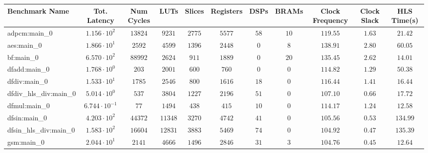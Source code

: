 \begin{tabular}{|l|c|c|c|c|c|c|c|c|c|c|}
\hline
Benchmark Name          & Tot. Latency            & Num Cycles & LUTs      & Slices    & Registers & DSPs    & BRAMs   & Clock Frequency & Clock Slack & HLS Time(s) \\
\hline
adpcm:main\_0           & $ 1.156 \cdot 10^{2}  $ & $ 13824  $ & $ 9231  $ & $ 2775  $ & $ 5577  $ & $ 58  $ & $ 10  $ & $ 119.55      $ & $ 1.63    $ & $ 21.42   $ \\
aes:main\_0             & $ 1.866 \cdot 10^{1}  $ & $ 2592   $ & $ 4599  $ & $ 1396  $ & $ 2448  $ & $ 0   $ & $ 8   $ & $ 138.91      $ & $ 2.80    $ & $ 60.05   $ \\
bf:main\_0              & $ 6.570 \cdot 10^{2}  $ & $ 88992  $ & $ 2624  $ & $ 911   $ & $ 1889  $ & $ 0   $ & $ 20  $ & $ 135.45      $ & $ 2.62    $ & $ 14.01   $ \\
dfadd:main\_0           & $ 1.768 \cdot 10^{0}  $ & $ 203    $ & $ 2001  $ & $ 600   $ & $ 760   $ & $ 0   $ & $ 0   $ & $ 114.82      $ & $ 1.29    $ & $ 50.38   $ \\
dfdiv:main\_0           & $ 1.533 \cdot 10^{1}  $ & $ 1785   $ & $ 2546  $ & $ 800   $ & $ 1616  $ & $ 18  $ & $ 0   $ & $ 116.44      $ & $ 1.41    $ & $ 16.44   $ \\
dfdiv\_hls\_div:main\_0 & $ 5.014 \cdot 10^{0}  $ & $ 537    $ & $ 3804  $ & $ 1227  $ & $ 2196  $ & $ 51  $ & $ 0   $ & $ 107.10      $ & $ 0.66    $ & $ 17.72   $ \\
dfmul:main\_0           & $ 6.744 \cdot 10^{-1} $ & $ 77     $ & $ 1494  $ & $ 438   $ & $ 415   $ & $ 10  $ & $ 0   $ & $ 114.17      $ & $ 1.24    $ & $ 12.58   $ \\
dfsin:main\_0           & $ 4.203 \cdot 10^{2}  $ & $ 44372  $ & $ 11348 $ & $ 3270  $ & $ 4742  $ & $ 41  $ & $ 0   $ & $ 105.56      $ & $ 0.53    $ & $ 134.99  $ \\
dfsin\_hls\_div:main\_0 & $ 1.583 \cdot 10^{2}  $ & $ 16604  $ & $ 12831 $ & $ 3883  $ & $ 5469  $ & $ 74  $ & $ 0   $ & $ 104.92      $ & $ 0.47    $ & $ 135.39  $ \\
gsm:main\_0             & $ 2.044 \cdot 10^{1}  $ & $ 2141   $ & $ 4666  $ & $ 1496  $ & $ 2846  $ & $ 31  $ & $ 3   $ & $ 104.76      $ & $ 0.45    $ & $ 12.64   $ \\

\end{tabular}
